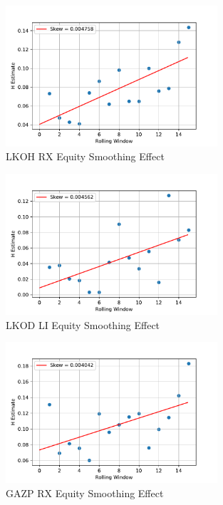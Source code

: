     \begin{figure}[h]
        \centering
        \includegraphics[width=0.7\textwidth]{fig/LKOH RX Equity Smoothing Effect.pdf}
        \caption{LKOH RX Equity Smoothing Effect}
    \end{figure} 

    \begin{figure}[h]
        \centering
        \includegraphics[width=0.7\textwidth]{fig/LKOD LI Equity Smoothing Effect.pdf}
        \caption{LKOD LI Equity Smoothing Effect}
    \end{figure}

    \begin{figure}[h]
        \centering
        \includegraphics[width=0.7\textwidth]{fig/GAZP RX Equity Smoothing Effect.pdf}
        \caption{GAZP RX Equity Smoothing Effect}
    \end{figure} 

